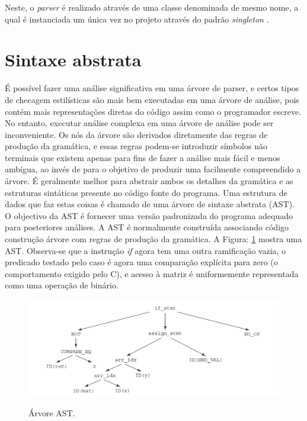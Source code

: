 	Neste, o \textit{parser} é realizado através de uma classe denominada de mesmo nome, a qual é instanciada um única vez no projeto através do padrão \textit{singleton} \cite{Gamma:1995:DPE:186897}.\\
	

	
	

	\section{Sintaxe abstrata}

	É possível fazer uma análise significativa em uma árvore de parser, e certos tipos de checagem estilísticas são mais bem executadas em uma árvore de análise, pois contém mais representações diretas do código assim como o programador escreve. No entanto, executar análise complexa em uma árvore de análise pode ser inconveniente. Os nós da árvore são derivados diretamente das regras de produção da gramática, e essas regras podem-se introduzir símbolos não terminais que existem apenas para fins de fazer a análise mais fácil e menos ambígua, ao invés de para o objetivo de produzir uma facilmente compreendido a árvore. É geralmente melhor para abstrair ambos os detalhes da gramática e as estruturas sintáticas presente no código fonte do programa. Uma estrutura de dados que faz estas coisas é chamado de uma árvore de sintaxe abstrata (AST). O objectivo da AST é fornecer uma versão padronizada do programa adequado para posteriores análises. A AST é normalmente construída associando código construção árvore com regras de produção da gramática. A Figura: \ref{fig:ArvoreAST} mostra uma AST. Observa-se que a instrução {\it if} agora tem uma outra ramificação vazia, o predicado testado pelo caso é agora uma comparação explícita para zero (o comportamento exigido pelo C), e acesso à matriz é uniformemente representada como uma operação de binário.\\
	
	\begin{figure}[h]
		\center
		\includegraphics[width=1\textwidth]{Imagens/ArvoreAST}
		\label{fig:ArvoreAST}
		\caption{Árvore AST.}
	\end{figure}

